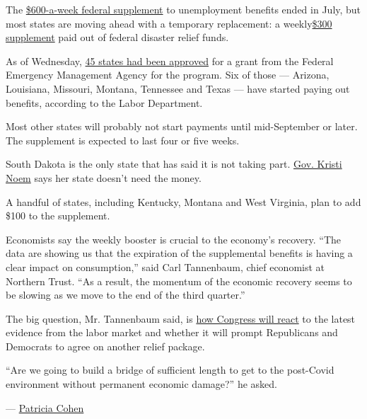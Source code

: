 The
\href{https://www.nytimes3xbfgragh.onion/2020/07/29/business/economy/unemployment-benefits-coronavirus.html?action=click\&module=RelatedLinks\&pgtype=Article}{\$600-a-week
federal supplement} to unemployment benefits ended in July, but most
states are moving ahead with a temporary replacement: a
weekly\href{https://www.nytimes3xbfgragh.onion/article/stimulus-unemployment-payment-benefit.html}{\$300
supplement} paid out of federal disaster relief funds.

As of Wednesday,
\href{https://www.nytimes3xbfgragh.onion/article/stimulus-unemployment-payment-benefit.html}{45
states had been approved} for a grant from the Federal Emergency
Management Agency for the program. Six of those --- Arizona, Louisiana,
Missouri, Montana, Tennessee and Texas --- have started paying out
benefits, according to the Labor Department.

Most other states will probably not start payments until mid-September
or later. The supplement is expected to last four or five weeks.

South Dakota is the only state that has said it is not taking part.
\href{https://www.nytimes3xbfgragh.onion/2020/08/16/us/elections/south-dakota-governor-turns-down-extra-unemployment-funding-saying-the-state-doesnt-need-it.html}{Gov.
Kristi Noem} says her state doesn't need the money.

A handful of states, including Kentucky, Montana and West Virginia, plan
to add \$100 to the supplement.

Economists say the weekly booster is crucial to the economy's recovery.
``The data are showing us that the expiration of the supplemental
benefits is having a clear impact on consumption,'' said Carl
Tannenbaum, chief economist at Northern Trust. ``As a result, the
momentum of the economic recovery seems to be slowing as we move to the
end of the third quarter.''

The big question, Mr. Tannenbaum said, is
\href{https://www.nytimes3xbfgragh.onion/2020/09/01/business/economy/mnuchin-coronavirus.html}{how
Congress will react} to the latest evidence from the labor market and
whether it will prompt Republicans and Democrats to agree on another
relief package.

``Are we going to build a bridge of sufficient length to get to the
post-Covid environment without permanent economic damage?'' he asked.

--- \href{https://www.nytimes3xbfgragh.onion/by/patricia-cohen}{Patricia
Cohen}

